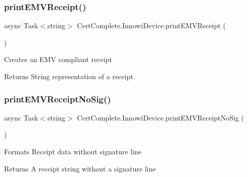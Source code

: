 \subsubsection{\texorpdfstring{print\+E\+M\+V\+Receipt()}{printEMVReceipt()}}
{\footnotesize\ttfamily async Task$<$string$>$ Cert\+Complete.\+Innowi\+Device.\+print\+E\+M\+V\+Receipt (\begin{DoxyParamCaption}{ }\end{DoxyParamCaption})\hspace{0.3cm}{\ttfamily [inline]}}



Creates an E\+MV compliant receipt 

\begin{DoxyReturn}{Returns}
String representation of a receipt.
\end{DoxyReturn}
\mbox{\label{class_cert_complete_1_1_innowi_device_a729ebb4b3a441a7dfb218ffbd3b31c86}} 
\subsubsection{\texorpdfstring{print\+E\+M\+V\+Receipt\+No\+Sig()}{printEMVReceiptNoSig()}}
{\footnotesize\ttfamily async Task$<$string$>$ Cert\+Complete.\+Innowi\+Device.\+print\+E\+M\+V\+Receipt\+No\+Sig (\begin{DoxyParamCaption}{ }\end{DoxyParamCaption})\hspace{0.3cm}{\ttfamily [inline]}}



Formats Receipt data without signature line 

\begin{DoxyReturn}{Returns}
A receipt string without a signature line
\end{DoxyReturn}
\mbox{\label{class_cert_complete_1_1_innowi_device_aa50e6a501d5d70ce75a6cbe66d8f5afe}} 
